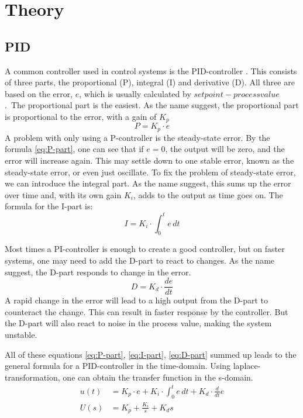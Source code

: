 \section{Theory}

\subsection{PID}
A common controller used in control systems is the PID-controller \cite{wiki-pid}. This consists of three parts, the proportional (P), integral (I) and derivative (D). All three are based on the error, $e$, which is usually calculated by $setpoint - process value$.\
The proportional part is the easiest. As the name suggest, the proportional part is proportional to the error, with a gain of $K_p$
\begin{equation}
    \label{eq:P-part}
    P = K_p \cdot e
\end{equation}
A problem with only using a P-controller is the steady-state error. By the formula \ref{eq:P-part}, one can see that if $e = 0$, the output will be zero, and the error will increase again. This may settle down to one stable error, known as the steady-state error, or even just oscillate.
To fix the problem of steady-state error, we can introduce the integral part. As the name suggest, this sums up the error over time and, with its own gain $K_i$, adds to the output as time goes on. The formula for the I-part is:
\begin{equation}
    \label{eq:I-part}
    I = K_i \cdot \int_{0}^{t} e\,dt
\end{equation}

Most times a PI-controller is enough to create a good controller, but on faster systems, one may need to add the D-part to react to changes. As the name suggest, the D-part responds to change in the error. 
\begin{equation}
    \label{eq:D-part}
    D = K_d \cdot \frac{de}{dt}
\end{equation}
A rapid change in the error will lead to a high output from the D-part to counteract the change. This can result in faster response by the controller. But the D-part will also react to noise in the process value, making the system unstable.

All of these equations \ref{eq:P-part}, \ref{eq:I-part}, \ref{eq:D-part} summed up leads to the general formula for a PID-controller in the time-domain. Using laplace-transformation, one can obtain the transfer function in the s-domain.
\begin{align}
    \label{eq:PID}
    u(t) &= K_p \cdot e + K_i \cdot \int_{0}^{t} e\,dt + K_d \cdot \frac{d}{dt} e\\
    U(s) &= K_p+\frac{K_i}{s}+K_ds
\end{align}


